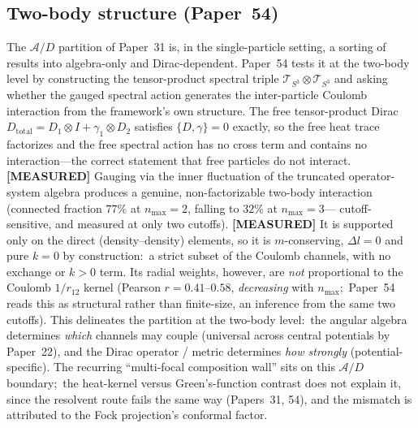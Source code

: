 \documentclass[aps,pra,twocolumn,superscriptaddress,longbibliography]{revtex4-2}
\begin{document}
\subsection{Two-body structure (Paper~54)}
The $\mathcal{A}/D$ partition of Paper~31 is, in the single-particle
setting, a sorting of results into algebra-only and Dirac-dependent.
Paper~54 tests it at the two-body level by constructing the
tensor-product spectral triple $\mathcal{T}_{S^3} \otimes
\mathcal{T}_{S^3}$ and asking whether the gauged spectral action
generates the inter-particle Coulomb interaction from the framework's
own structure.  The free tensor-product Dirac $D_{\mathrm{total}} = D_1
\otimes I + \gamma_1 \otimes D_2$ satisfies $\{D, \gamma\} = 0$ exactly,
so the free heat trace factorizes and the free spectral action has no
cross term and contains no
interaction---the correct statement that free particles do not interact.
\textbf{[MEASURED]} Gauging via the inner fluctuation of the truncated operator-system
algebra produces a genuine, non-factorizable two-body interaction
(connected fraction $77\%$ at $n_{\max} = 2$, falling to $32\%$ at $n_{\max} = 3$---
cutoff-sensitive, and measured at only two cutoffs).  \textbf{[MEASURED]} It is
supported only on the direct (density--density) elements, so it is
$m$-conserving, $\Delta l = 0$ and pure $k = 0$ by construction:\ a
strict subset of the Coulomb channels, with no exchange or $k > 0$ term.
Its radial weights, however, are \emph{not} proportional to the Coulomb
$1/r_{12}$ kernel (Pearson $r = 0.41$--$0.58$, \emph{decreasing} with
$n_{\max}$;\ Paper~54 reads this as structural rather than finite-size,
an inference from the same two cutoffs).  This delineates the
partition at the two-body level:\ the angular algebra determines
\emph{which} channels may couple (universal across central potentials
by Paper~22), and the Dirac operator / metric determines \emph{how
strongly} (potential-specific).  The recurring ``multi-focal
composition wall'' sits on this $\mathcal{A}/D$ boundary;\ the
heat-kernel versus Green's-function contrast does not explain it, since
the resolvent route fails the same way (Papers~31, 54), and the
mismatch is attributed to the Fock projection's conformal factor.
\end{document}
